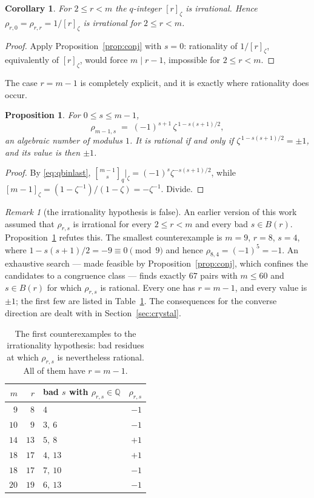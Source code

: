 \documentclass[11pt,a4paper]{article}
\theoremstyle{plain}
\newtheorem{proposition}[theorem]{Proposition}
\newtheorem{corollary}[theorem]{Corollary}
\theoremstyle{definition}
\theoremstyle{remark}
\newtheorem{remark}[theorem]{Remark}
\newcommand{\Q}{\mathbb{Q}}
\newcommand{\qbin}[2]{\genfrac[]{0pt}{}{#1}{#2}_{q}}
\begin{document}
\begin{corollary}\label{cor:qintirr}
For $2\le r<m$ the $q$-integer $[r]_\zeta$ is irrational. Hence
$\rho_{r,0}=\rho_{r,r}=1/[r]_\zeta$ is irrational for $2\le r<m$.
\end{corollary}

\begin{proof}
Apply Proposition~\ref{prop:conj} with $s=0$: rationality of $1/[r]_\zeta$, equivalently of
$[r]_\zeta$, would force $m\mid r-1$, impossible for $2\le r<m$.
\end{proof}

The case $r=m-1$ is completely explicit, and it is exactly where rationality does occur.

\begin{proposition}\label{prop:rlast}
For $0\le s\le m-1$,
\[
  \rho_{m-1,s}\;=\;(-1)^{s+1}\,\zeta^{\,1-s(s+1)/2},
\]
an algebraic number of modulus $1$. It is rational if and only if
$\zeta^{\,1-s(s+1)/2}=\pm1$, and its value is then $\pm1$.
\end{proposition}

\begin{proof}
By \eqref{eq:qbinlast}, $\qbin{m-1}{s}\big|_\zeta=(-1)^{s}\zeta^{-s(s+1)/2}$, while
$[m-1]_\zeta=(1-\zeta^{-1})/(1-\zeta)=-\zeta^{-1}$. Divide.
\end{proof}

\begin{remark}[the irrationality hypothesis is false]\label{rem:hypfalse}
An earlier version of this work assumed that $\rho_{r,s}$ is irrational for every $2\le r<m$
and every bad $s\in B(r)$. Proposition~\ref{prop:rlast} refutes this. The smallest
counterexample is $m=9$, $r=8$, $s=4$, where $1-s(s+1)/2=-9\equiv0\pmod9$ and hence
$\rho_{8,4}=(-1)^{5}=-1$. An exhaustive search --- made feasible by
Proposition~\ref{prop:conj}, which confines the candidates to a congruence class --- finds
exactly $67$ pairs with $m\le60$ and $s\in B(r)$ for which $\rho_{r,s}$ is rational. Every
one has $r=m-1$, and every value is $\pm1$; the first few are listed in
Table~\ref{tab:counterex}. The consequences for the converse direction are dealt with in
Section~\ref{sec:crystal}.
\end{remark}

\begin{table}[h]
\centering
\small
\begin{tabular}{rrlr}
$m$ & $r$ & bad $s$ with $\rho_{r,s}\in\Q$ & $\rho_{r,s}$\\\hline
$9$  & $8$  & $4$      & $-1$\\
$10$ & $9$  & $3,\ 6$  & $-1$\\
$14$ & $13$ & $5,\ 8$  & $+1$\\
$18$ & $17$ & $4,\ 13$ & $+1$\\
$18$ & $17$ & $7,\ 10$ & $-1$\\
$20$ & $19$ & $6,\ 13$ & $-1$\\
\end{tabular}
\caption{The first counterexamples to the irrationality hypothesis: bad residues at which
$\rho_{r,s}$ is nevertheless rational. All of them have $r=m-1$.}
\label{tab:counterex}
\end{table}
\end{document}
